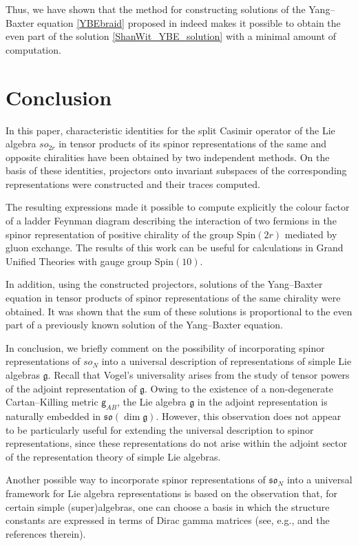\documentclass[a4paper]{article}
\newcommand{\kg}{\mathsf{g}}
\newcommand{\Spin}{\mathrm{Spin}}
\renewcommand{\=}{\ =\ }
\newcommand{\mfg}{\mathfrak{g}}
\numberwithin{equation}{section}
\theoremstyle{remark}
\begin{document}
Thus, we have shown that the method for constructing solutions of the Yang--Baxter equation \eqref{YBEbraid} proposed in \cite{MacKay} indeed makes it possible to obtain the even part of the solution \eqref{ShanWit_YBE_solution} with a minimal amount of computation.

\section*{Conclusion}

In this paper, characteristic identities for the split Casimir operator of the Lie algebra $so_{2r}$ in tensor products of its spinor representations of the same and opposite chiralities have been obtained by two independent methods. On the basis of these identities, projectors onto invariant subspaces of the corresponding representations were constructed and their traces computed.

The resulting expressions made it possible to compute explicitly the colour factor of a ladder Feynman diagram describing the interaction of two fermions in the spinor representation of positive chirality of the group $\Spin(2r)$ mediated by gluon exchange. The results of this work can be useful for calculations in Grand Unified Theories with gauge group $\Spin(10)$.

In addition, using the constructed projectors, solutions of the Yang--Baxter equation in tensor products of spinor representations of the same chirality were obtained. It was shown that the sum of these solutions is proportional to the even part of a previously known solution of the Yang--Baxter equation.

In conclusion, we briefly comment on the possibility of incorporating spinor representations of $so_N$ into a universal description of representations of simple Lie algebras $\mathfrak{g}$. Recall that Vogel’s universality arises from the study of tensor powers of the adjoint representation of $\mfg$. Owing to the existence of a non-degenerate Cartan–Killing metric $\kg_{AB}$, the Lie algebra $\mfg$ in the adjoint representation is naturally embedded in $\mathfrak{so}(\dim \mathfrak{g})$. However, this observation does not appear to be particularly useful for extending the universal description to spinor representations, since these representations do not arise within the adjoint sector of the representation theory of simple Lie algebras.

Another possible way to incorporate spinor representations of $\mathfrak{so}_N$ into a universal framework for Lie algebra representations is based on the observation that, for certain simple (super)algebras, one can choose a basis in which the structure constants are expressed in terms of Dirac gamma matrices (see, e.g., \cite{IsaIv,Stepan} and the references therein).
\end{document}
